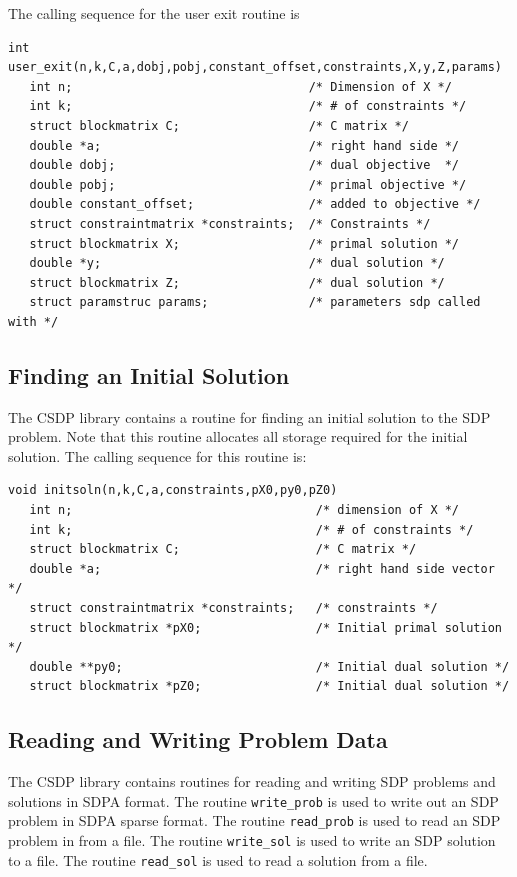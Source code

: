 \documentclass{article}
\begin{document}
The calling sequence for the user exit routine is
\begin{verbatim}
int user_exit(n,k,C,a,dobj,pobj,constant_offset,constraints,X,y,Z,params)
   int n;                                 /* Dimension of X */
   int k;                                 /* # of constraints */
   struct blockmatrix C;                  /* C matrix */
   double *a;                             /* right hand side */
   double dobj;                           /* dual objective  */
   double pobj;                           /* primal objective */
   double constant_offset;                /* added to objective */ 
   struct constraintmatrix *constraints;  /* Constraints */
   struct blockmatrix X;                  /* primal solution */
   double *y;                             /* dual solution */
   struct blockmatrix Z;                  /* dual solution */
   struct paramstruc params;              /* parameters sdp called with */
\end{verbatim}
\subsection*{Finding an Initial Solution}
The CSDP library contains a routine for finding an initial solution to the
SDP problem.  Note that this routine allocates all storage required for the
initial solution.  The calling sequence for this routine is:

\begin{verbatim}
void initsoln(n,k,C,a,constraints,pX0,py0,pZ0)
   int n;                                  /* dimension of X */
   int k;                                  /* # of constraints */
   struct blockmatrix C;                   /* C matrix */
   double *a;                              /* right hand side vector */
   struct constraintmatrix *constraints;   /* constraints */
   struct blockmatrix *pX0;                /* Initial primal solution */
   double **py0;                           /* Initial dual solution */
   struct blockmatrix *pZ0;                /* Initial dual solution */
\end{verbatim}


\subsection*{Reading and Writing Problem Data}
The CSDP library contains routines for reading and writing SDP
problems and solutions in SDPA format. The routine {\tt write\_prob}
is used to write out an SDP problem in SDPA sparse format.  The
routine {\tt read\_prob} is used to read an SDP problem in from a
file.  The routine {\tt write\_sol} is used to write an SDP solution
to a file.  The routine {\tt read\_sol} is used to read a solution
from a file.
\end{document}
